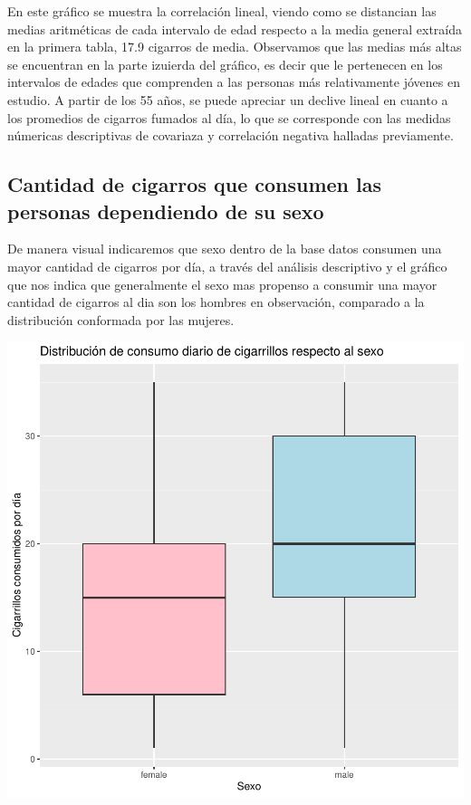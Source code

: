 \documentclass[
  stu,
  longtable,
  nolmodern,
  notxfonts,
  notimes,
  colorlinks=true,linkcolor=blue,citecolor=blue,urlcolor=blue]{apa7}
\begin{document}
En este gráfico se muestra la correlación lineal, viendo como se
distancian las medias aritméticas de cada intervalo de edad respecto a
la media general extraída en la primera tabla, 17.9 cigarros de media.
Observamos que las medias más altas se encuentran en la parte izuierda
del gráfico, es decir que le pertenecen en los intervalos de edades que
comprenden a las personas más relativamente jóvenes en estudio. A partir
de los 55 años, se puede apreciar un declive lineal en cuanto a los
promedios de cigarros fumados al día, lo que se corresponde con las
medidas númericas descriptivas de covariaza y correlación negativa
halladas previamente.

\subsection{Cantidad de cigarros que consumen las personas dependiendo
de su
sexo}\label{cantidad-de-cigarros-que-consumen-las-personas-dependiendo-de-su-sexo}

De manera visual indicaremos que sexo dentro de la base datos consumen
una mayor cantidad de cigarros por día, a través del análisis
descriptivo y el gráfico que nos indica que generalmente el sexo mas
propenso a consumir una mayor cantidad de cigarros al dia son los
hombres en observación, comparado a la distribución conformada por las
mujeres.

\includegraphics{Plantilla_Apa_files/figure-pdf/unnamed-chunk-2-1.pdf}
\end{document}
